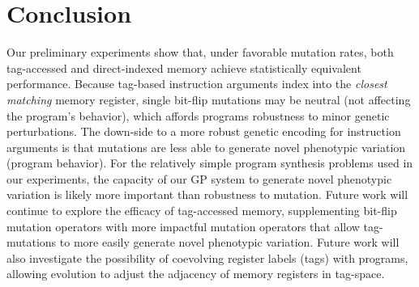 \section{Conclusion}

Our preliminary experiments show that, under favorable mutation rates, both tag-accessed and direct-indexed memory achieve statistically equivalent performance.
Because tag-based instruction arguments index into the \textit{closest matching} memory register, single bit-flip mutations may be neutral (not affecting the program's behavior), which affords programs robustness to minor genetic perturbations. 
The down-side to a more robust genetic encoding for instruction arguments is that mutations are less able to generate novel phenotypic variation (program behavior).
For the relatively simple program synthesis problems used in our experiments, the capacity of our GP system to generate novel phenotypic variation is likely more important than robustness to mutation. 
Future work will continue to explore the efficacy of tag-accessed memory, supplementing bit-flip mutation operators with more impactful mutation operators that allow tag-mutations to more easily generate novel phenotypic variation.
Future work will also investigate the possibility of coevolving register labels (tags) with programs, allowing evolution to adjust the adjacency of memory registers in tag-space.